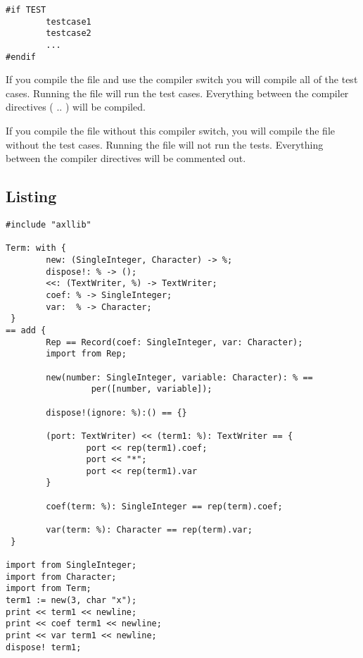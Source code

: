 \begin{small}
\begin{verbatim}
#if TEST
        testcase1
        testcase2
        ...
#endif
\end{verbatim}
\end{small}

If you compile the file and use the compiler switch  you will
compile all of the test cases. Running the file will run the test cases.
Everything between the compiler directives ( .. )
will be compiled.

If you compile the file without this compiler switch, you will compile
the file without the test cases. Running the file will not run the tests.
Everything between the compiler directives will be commented out.

%


\subsection{Listing}

\label{FirstTermRepListing}

\begin{small}
\begin{verbatim}
#include "axllib"

Term: with {
        new: (SingleInteger, Character) -> %;
        dispose!: % -> ();
        <<: (TextWriter, %) -> TextWriter;
        coef: % -> SingleInteger;
        var:  % -> Character;
 }
== add {
        Rep == Record(coef: SingleInteger, var: Character);
        import from Rep;

        new(number: SingleInteger, variable: Character): % == 
                 per([number, variable]);

        dispose!(ignore: %):() == {}

        (port: TextWriter) << (term1: %): TextWriter == {
                port << rep(term1).coef;
                port << "*";
                port << rep(term1).var
        }

        coef(term: %): SingleInteger == rep(term).coef;

        var(term: %): Character == rep(term).var;
 }

import from SingleInteger;
import from Character;
import from Term;
term1 := new(3, char "x");
print << term1 << newline;
print << coef term1 << newline;
print << var term1 << newline;
dispose! term1;

\end{verbatim}
\end{small}

